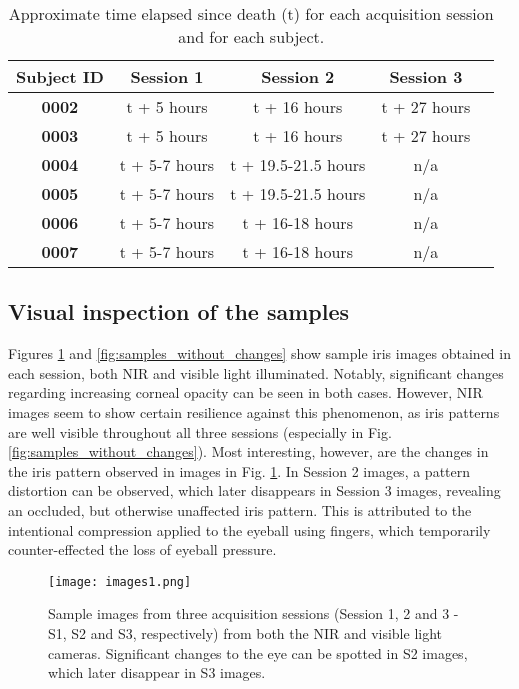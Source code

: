 \documentclass[10pt,twocolumn,letterpaper]{article}
\begin{document}
\begin{table}[!ht]
\renewcommand{\arraystretch}{1.1}
\caption{Approximate time elapsed since death (t) for each acquisition session and for each subject.}
\label{table:database}
\centering\footnotesize
\begin{tabular}[t]{|c|c|c|c|c|}
\hline
\textbf{Subject ID} & \textbf{Session 1} & \textbf{Session 2} & \textbf{Session 3}\\
\hline
\hline
\textbf{0002} & {t + 5 hours} & {t + 16 hours} & {t + 27 hours}  \\
\hline
\textbf{0003} & {t + 5 hours} & {t + 16 hours} & {t + 27 hours} 	 \\
\hline
\textbf{0004} & {t + 5-7 hours} & {t + 19.5-21.5 hours}   & n/a\\
\hline
\textbf{0005} &{t + 5-7 hours} & {t + 19.5-21.5 hours}   & n/a\\
\hline
\textbf{0006} & {t + 5-7 hours} & {t + 16-18 hours} & n/a \\
\hline
\textbf{0007} & {t + 5-7 hours} & {t + 16-18 hours} & n/a \\
\hline
\end{tabular}
\end{table}

\subsection{Visual inspection of the samples}
Figures \ref{fig:samples_with_changes} and \ref{fig:samples_without_changes} show sample iris images obtained in each session, both NIR and visible light illuminated. Notably, significant changes regarding increasing corneal opacity can be seen in both cases. However, NIR images seem to show certain resilience against this phenomenon, as iris patterns are well visible throughout all three sessions (especially in Fig. \ref{fig:samples_without_changes}). Most interesting, however, are the changes in the iris pattern observed in images in Fig. \ref{fig:samples_with_changes}. In Session 2 images, a pattern distortion can be observed, which later disappears in Session 3 images, revealing an occluded, but otherwise unaffected iris pattern. This is attributed to the intentional compression applied to the eyeball using fingers, which temporarily counter-effected the loss of eyeball pressure.

\begin{figure}[!t]
\centering
\texttt{[image: images1.png]}
\caption{Sample images from three acquisition sessions (Session 1, 2 and 3 - S1, S2 and S3, respectively) from both the NIR and visible light cameras. Significant changes to the eye can be spotted in S2 images, which later disappear in S3 images.}
\label{fig:samples_with_changes}
\end{figure}
\end{document}
